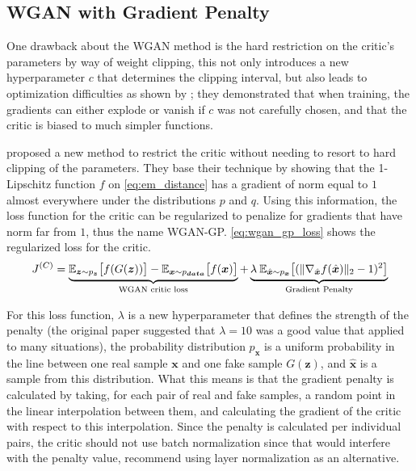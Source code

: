\subsection{WGAN with Gradient Penalty} \label{sub:wgan_gp}
One drawback about the \gls{WGAN} method is the hard restriction on the critic's parameters by way of weight clipping, this not only introduces a new hyperparameter $c$ that determines the clipping interval, but also leads to optimization difficulties as shown by \textcite{wgan-gp2017}; they demonstrated that when training, the gradients can either explode or vanish if $c$ was not carefully chosen, and that the critic is biased to much simpler functions.

\textcite{wgan-gp2017} proposed a new method to restrict the critic without needing to resort to hard clipping of the parameters. They base their technique by showing that the 1-Lipschitz function $f$ on \autoref{eq:em_distance} has a gradient of norm equal to $1$ almost everywhere under the distributions $p$ and $q$. Using this information, the loss function for the critic can be regularized to penalize for gradients that have norm far from $1$, thus the name \gls{WGAN-GP}. \autoref{eq:wgan_gp_loss} shows the regularized loss for the critic.
\begin{equation} \label{eq:wgan_gp_loss}
    J^{(C)} = \LaTeXunderbrace{\strut
        \mathbb{E}_{\bm{z}\sim p_{\bm{z}}} {\bigl\lbrack f(G(\bm{z})) \bigr\rbrack} - 
        \mathbb{E}_{\bm{x}\sim p_{\bm{data}}} {\bigl\lbrack f(\bm{x}) \bigr\rbrack}
    }_{\text{WGAN critic loss}} +
    \LaTeXunderbrace{
        \lambda\:\mathbb{E}_{\hat{\bm{x}}\sim p_{\bm{x}}} {
            \left\lbrack (\| \nabla_{\hat{\bm{x}}}f(\hat{\bm{x}})\|_{2} - 1)^{2} \right\rbrack
        }
    }_{\text{Gradient Penalty}}
\end{equation}

For this loss function, $\lambda$ is a new hyperparameter that defines the strength of the penalty (the original paper suggested that $\lambda = 10$ was a good value that applied to many situations), the probability distribution $p_{\bm{x}}$ is a uniform probability in the line between one real sample $\bm{x}$ and one fake sample $G(\bm{z})$, and $\hat{\bm{x}}$ is a sample from this distribution. What this means is that the gradient penalty is calculated by taking, for each pair of real and fake samples, a random point in the linear interpolation between them, and calculating the gradient of the critic with respect to this interpolation. Since the penalty is calculated per individual pairs, the critic should not use batch normalization since that would interfere with the penalty value, \textcite{wgan-gp2017} recommend using layer normalization as an alternative.


